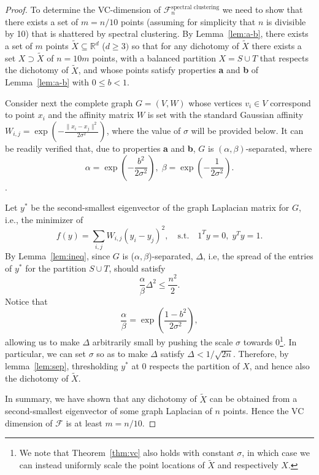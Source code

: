\documentclass{article} %
\begin{document}

\begin{proof}
To determine the VC-dimension of $\mathcal{F}^\text{spectral clustering}_n$ we need to show that there exists a set of $m=n/10$ points (assuming for simplicity that $n$ is divisible by 10) that is shattered by spectral clustering. By Lemma~\ref{lem:a-b}, there exists a set of $m$ points $\tilde{X} \subseteq \mathbb{R}^d$ ($d \ge 3)$ so that for any dichotomy of $\tilde{X}$ there exists a set $X \supset \tilde X$ of $n = 10m$ points, with a balanced partition $X=S\cup T$ that respects the dichotomy of $\tilde{X}$, and whose points satisfy properties \textbf{a} and \textbf{b} of Lemma~\ref{lem:a-b} with $0 \le b < 1$.

Consider next the complete graph $G=(V,W)$ whose vertices $v_i \in V$ correspond to point $x_i$ and the affinity matrix $W$ is set with the standard Gaussian affinity  $W_{i,j} = \exp\left(-\frac{\|x_i-x_j \|^2}{2\sigma^2}\right)$, where the value of $\sigma$ will be provided below.  It can be readily verified that, due to properties \textbf{a} and \textbf{b}, $G$ is $(\alpha,\beta)$-separated, where
$$ \alpha = \exp\left(-\frac{b^2}{2\sigma^2}\right), \;  \beta = \exp\left(-\frac{1}{2\sigma^2}\right).$$
.

Let $y^*$ be the second-smallest eigenvector of the graph Laplacian matrix for $G$, i.e., the minimizer of
$$f(y) = \sum_{i,j} W_{i,j}(y_i-y_j)^2, \quad
\text{s.t.} \quad 1^Ty=0,\; y^Ty=1.$$
By Lemma~\ref{lem:ineq}, since $G$ is ($\alpha,\beta$)-separated, $\Delta$, i.e, the spread of the entries of $y^*$ for the partition $S \cup T$, should satisfy
$$\frac{\alpha}{\beta}\Delta^2 \le \frac{n^2}{2}.$$
Notice that
$$\frac{\alpha}{\beta} = \exp\left(\frac{1-b^2}{2\sigma^2} \right),$$
allowing us to make $\Delta$ arbitrarily small by pushing the scale $\sigma$ towards 0\footnote{We note that Theorem~\ref{thm:vc} also holds with constant $\sigma$, in which case we can instead uniformly scale the point locations of $\tilde X$ and respectively $X$.}. In particular, we can set $\sigma$ so as to make $\Delta$ satisfy $\Delta < 1/\sqrt{2n}$. Therefore, by lemma~\eqref{lem:sep}, thresholding $y^*$ at 0 respects the partition of $X$, and hence also the dichotomy of $\tilde{X}$.

In summary, we have shown that any dichotomy of $\tilde{X}$ can be obtained from a second-smallest eigenvector of some graph Laplacian of $n$ points. Hence the VC dimension of $\mathcal{F}$ is at least $m = n/10$.
\end{proof}
\end{document}
